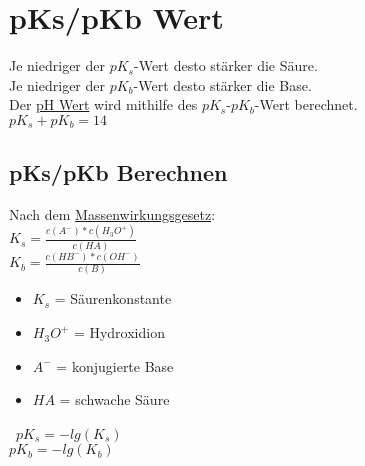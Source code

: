 \section{pKs/pKb Wert} \label{sec:pks_pkb}
Je niedriger der $pK_s$-Wert desto stärker die Säure. \\
Je niedriger der $pK_b$-Wert desto stärker die Base. \\
Der \hyperref[sec:ph_wert]{pH Wert} wird mithilfe des $pK_s$-$pK_b$-Wert berechnet. \\
$pK_s + pK_b = 14$ \\

\subsection{pKs/pKb Berechnen}
Nach dem \hyperref[sec:mwg]{Massenwirkungsgesetz}: \\
$K_s = \frac{c(A^-)*c(H_3O^+)}{c(HA)}$ \\
$K_b = \frac{c(HB^-)*c(OH^-)}{c(B)}$ 

\begin{itemize}
    \item $K_s$ = Säurenkonstante
    \item $H_3O^+$ = Hydroxidion
    \item $A^-$ = konjugierte Base
    \item $HA$ = schwache Säure
\end{itemize}
\
$pK_s = -lg(K_s)$ \\
$pK_b = -lg(K_b)$

